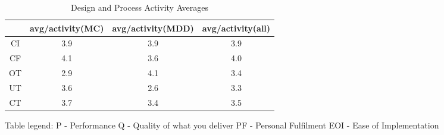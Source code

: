\documentclass[final_report_innit.tex]{subfiles}
\begin{document}
\begin{table}[h]
\caption{Design and Process Activity Averages}
\centering
\begin{tabular}{@{}c|c|c|c|@{}}
\cmidrule(l){2-4}
\multicolumn{1}{l|}{}    & \multicolumn{1}{l|}{avg/activity(MC)} & \multicolumn{1}{l|}{avg/activity(MDD)} & \multicolumn{1}{l|}{avg/activity(all)} \\ \midrule
\multicolumn{1}{|c|}{CI} & 3.9                                & 3.9                                 & 3.9                                 \\ \midrule
\multicolumn{1}{|c|}{CF} & 4.1                                & 3.6                                 & 4.0                                 \\ \midrule
\multicolumn{1}{|c|}{OT} & 2.9                                & 4.1                                 & 3.4                                 \\ \midrule
\multicolumn{1}{|c|}{UT} & 3.6                                & 2.6                                 & 3.3                                 \\ \midrule
\multicolumn{1}{|c|}{CT} & 3.7                                & 3.4                                 & 3.5                                 \\ \bottomrule
\end{tabular}
\end{table}

Table legend:
P - Performance
Q - Quality of what you deliver
PF - Personal Fulfilment
EOI - Ease of Implementation
\end{document}

